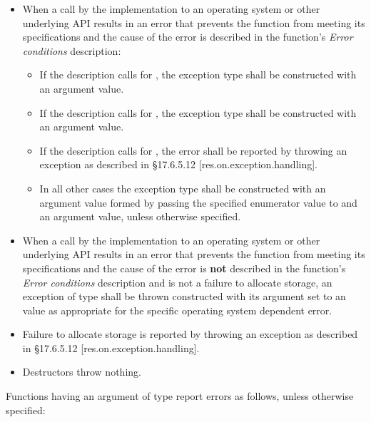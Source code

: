 \begin{itemize}
\item When a call by the implementation to an operating system or other underlying API results in an error that prevents the function from meeting its specifications and the cause of the error is described in the function's \textit{Error conditions} description:
	\begin{itemize}
		\item If the description calls for , the exception type shall be  constructed with an \impdef {} argument value.
		\item If the description calls for , the exception type shall be  constructed with an \impdef {} argument value.
		\item If the description calls for , the error shall be reported by throwing an exception as described in \CppXIV \S17.6.5.12 [res.on.exception.handling].
		\item In all other cases the exception type shall be  constructed with an  argument value formed by passing the specified enumerator value to  and an \impdef {} argument value, unless otherwise specified.
	\end{itemize}

\item When a call by the implementation to an operating system or other underlying API results in an error that prevents the function from meeting its specifications and the cause of the error is \textbf{not} described in the function's \textit{Error conditions} description and is not a failure to allocate storage, an exception of type  shall be thrown constructed with its  argument set to an \impdef value as appropriate for the specific operating system dependent error. 

\item Failure to allocate storage is reported by throwing an exception as described in \CppXIV \S17.6.5.12 [res.on.exception.handling].

\item Destructors throw nothing.
\end{itemize}

\pnum
Functions having an argument of type  report errors as follows, unless otherwise specified:

